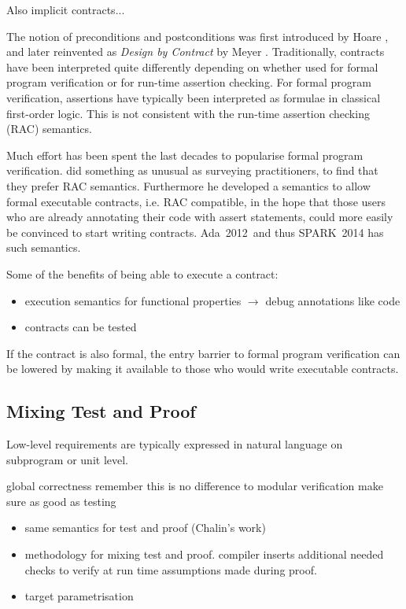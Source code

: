 \documentclass[sttt,draft]{svjour}
\newcommand{\newspark}{SPARK~2014\xspace}
\newcommand{\adatwtw}{Ada~2012\xspace}
\begin{document}
Also implicit contracts...

The notion of preconditions and postconditions was first introduced by
Hoare \cite{}, and later reinvented as \emph{Design by Contract} by
Meyer \cite{}. Traditionally, contracts have been interpreted quite
differently depending on whether used for formal program verification
or for run-time assertion checking. For formal program verification,
assertions have typically been interpreted as formulae in classical
first-order logic. This is not consistent with the run-time assertion
checking (RAC) semantics.

Much effort has been spent the last decades to popularise formal
program verification. \cite{tseChalin10} did something as unusual as
surveying practitioners, to find that they prefer RAC
semantics. Furthermore he developed a semantics to allow formal
executable contracts, i.e. RAC compatible, in the hope that those
users who are already annotating their code with assert statements,
could more easily be convinced to start writing contracts. \adatwtw\
and thus \newspark has such semantics.

Some of the benefits of being able to execute a contract:
\begin{itemize}
\item execution semantics for functional properties $\rightarrow$ debug
  annotations like code
\item contracts can be tested
\end{itemize}
If the contract is also formal, the entry barrier to formal program
verification can be lowered by making it available to those who would
write executable contracts.

\subsection{Mixing Test and Proof}

Low-level requirements are typically expressed in natural language on
subprogram or unit level.

global correctness
remember this is no difference to modular verification
make sure as good as testing
\begin{itemize}
\item same semantics for test and proof (Chalin's work)
\item methodology for mixing test and proof. compiler inserts additional needed
  checks to verify at run time assumptions made during proof.
\item target parametrisation
\end{itemize}
\end{document}
